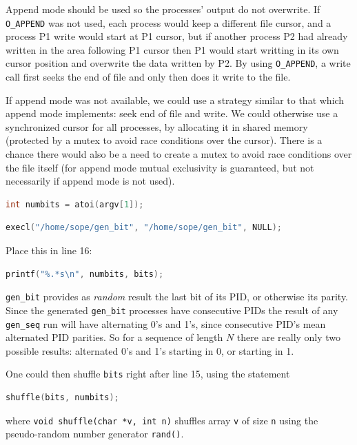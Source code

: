 \documentclass{sope}
\begin{document}
{
Append mode should be used so the processes' output do not overwrite. If \texttt{O\_APPEND} was not used, each process would keep a different file cursor, and a process P1 write would start at P1 cursor, but if another process P2 had already written in the area following P1 cursor then P1 would start writting in its own cursor position and overwrite the data written by P2. By using \texttt{O\_APPEND}, a write call first seeks the end of file and only then does it write to the file.

If append mode was not available, we could use a strategy similar to that which append mode implements: seek end of file and write. We could otherwise use a synchronized cursor for all processes, by allocating it in shared memory (protected by a mutex to avoid race conditions over the cursor). There is a chance there would also be a need to create a mutex to avoid race conditions over the file itself (for append mode mutual exclusivity is guaranteed, but not necessarily if append mode is not used).

\begin{lstlisting}[language=C]
    int numbits = atoi(argv[1]);
\end{lstlisting}
\begin{lstlisting}[language=C]
    execl("/home/sope/gen_bit", "/home/sope/gen_bit", NULL);
\end{lstlisting}
Place this in line 16:
\begin{lstlisting}[language=C]
    printf("%.*s\n", numbits, bits);
\end{lstlisting}

\texttt{gen\_bit} provides as \emph{random} result the last bit of its PID, or otherwise its parity. Since the generated \texttt{gen\_bit} processes have consecutive PIDs the result of any \texttt{gen\_seq} run will have alternating 0's and 1's, since consecutive PID's mean alternated PID parities. So for a sequence of length $N$ there are really only two possible results: alternated 0's and 1's starting in 0, or starting in 1.

One could then shuffle \texttt{bits} right after line 15, using the statement
\begin{lstlisting}[language=C]
    shuffle(bits, numbits);
\end{lstlisting}
where \texttt{void shuffle(char *v, int n)} shuffles array \texttt{v} of size \texttt{n} using the pseudo-random number generator \texttt{rand()}.

}
\end{document}
